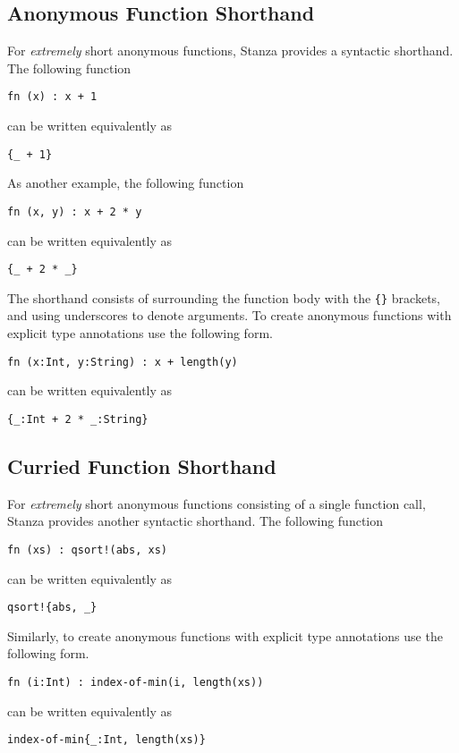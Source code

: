 \documentclass[10pt,oneside]{book}
\begin{document}
\subsection*{Anonymous Function Shorthand}
For {\em extremely} short anonymous functions, Stanza provides a syntactic shorthand. The following function
\begin{lstlisting}
fn (x) : x + 1
\end{lstlisting}
can be written equivalently as
\begin{lstlisting}
{_ + 1}
\end{lstlisting}

As another example, the following function
\begin{lstlisting}
fn (x, y) : x + 2 * y
\end{lstlisting}
can be written equivalently as
\begin{lstlisting}
{_ + 2 * _}
\end{lstlisting}

The shorthand consists of surrounding the function body with the \texttt{\frenchspacing \{\}} brackets, and using underscores to denote arguments. To create anonymous functions with explicit type annotations use the following form.
\begin{lstlisting}
fn (x:Int, y:String) : x + length(y)
\end{lstlisting}
can be written equivalently as
\begin{lstlisting}
{_:Int + 2 * _:String}
\end{lstlisting}

\subsection*{Curried Function Shorthand}
For {\em extremely} short anonymous functions consisting of a single function call, Stanza provides another syntactic shorthand. The following function
\begin{lstlisting}
fn (xs) : qsort!(abs, xs)
\end{lstlisting}
can be written equivalently as
\begin{lstlisting}
qsort!{abs, _}
\end{lstlisting}

Similarly, to create anonymous functions with explicit type annotations use the following form.
\begin{lstlisting}
fn (i:Int) : index-of-min(i, length(xs))
\end{lstlisting}
can be written equivalently as
\begin{lstlisting}
index-of-min{_:Int, length(xs)}
\end{lstlisting}
\end{document}
